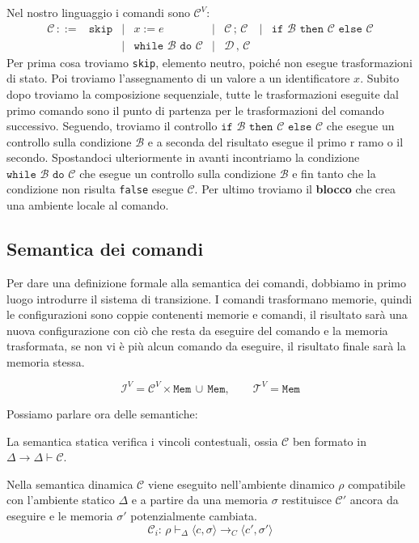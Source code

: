 \documentclass[oneside,a4paper,11pt]{book}
\theoremstyle{italicstyle}
\theoremstyle{normStyle}
\begin{document}
Nel nostro linguaggio i comandi sono $\mathcal{C}^V$:
\[
  \begin{matrix}
    \mathcal{C}\,::= & \texttt{skip} & | & x := e & | & \mathcal{C}\,;\,\mathcal{C}& | &
    \texttt{if }\mathcal{B}\texttt{ then }\mathcal{C}\texttt{ else }\mathcal{C} \\
    &&| & \texttt{while }\mathcal{B}\texttt{ do }\mathcal{C} & | & \mathcal{D}\,,\,\mathcal{C}
  \end{matrix}
\]
Per prima cosa troviamo \verb|skip|, elemento neutro, poiché non esegue trasformazioni di stato. 
Poi troviamo l'assegnamento di un valore a un identificatore $x$. Subito dopo troviamo 
la composizione sequenziale, tutte le trasformazioni eseguite dal primo comando sono 
il punto di partenza per le trasformazioni del comando successivo. Seguendo, troviamo 
il controllo $\texttt{if }\mathcal{B}\texttt{ then }\mathcal{C}\texttt{ else }\mathcal{C}$
che esegue un controllo sulla condizione $\mathcal{B}$ e a seconda del risultato esegue il primo r
ramo o il secondo. Spostandoci ulteriormente in avanti incontriamo la condizione 
$\texttt{while }\mathcal{B}\texttt{ do }\mathcal{C}$ che esegue un controllo 
sulla condizione $\mathcal{B}$ e fin tanto che la condizione non risulta \verb|false| 
esegue $\mathcal{C}$. Per ultimo troviamo il \textbf{blocco} che crea una ambiente locale al comando.

\subsection{Semantica dei comandi}
Per dare una definizione formale alla semantica dei comandi, dobbiamo in primo 
luogo introdurre il sistema di transizione. I comandi trasformano memorie,
quindi le configurazioni sono coppie contenenti memorie e comandi, il risultato 
sarà una nuova configurazione con ciò che resta da eseguire del comando e la memoria 
trasformata, se non vi è più alcun comando da eseguire, il risultato finale 
sarà la memoria stessa.
\begin{tcolorbox}[title = {Sistema di transizione}]
  \[
  \mathcal{I}^V = \mathcal{C}^V \times \texttt{Mem}\,\cup\,\texttt{Mem},\qquad
  \mathcal{T}^V = \texttt{Mem}
  \]
\end{tcolorbox}
Possiamo parlare ora delle semantiche:
\begin{tcolorbox}[title ={Semantica statica}]
  La semantica statica verifica i vincoli contestuali, ossia $\mathcal{C}$ ben formato 
  in $\Delta \rightarrow \Delta \vdash \mathcal{C}$.
\end{tcolorbox}
\begin{tcolorbox}[title ={Semantica dinamica}]
  Nella semantica dinamica $\mathcal{C}$ viene eseguito nell'ambiente dinamico $\rho$ 
  compatibile con l'ambiente statico $\Delta$ e a partire da una memoria $\sigma$ restituisce $\mathcal{C}'$
  ancora da eseguire e le memoria $\sigma'$ potenzialmente cambiata.
  \[
    \mathcal{C}_i : \, \rho \vdash_\Delta \langle c,\sigma\rangle \rightarrow_C \langle c',\sigma' \rangle
  \]
\end{tcolorbox}
\end{document}
